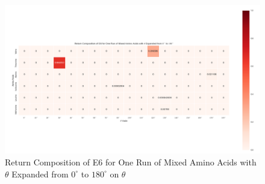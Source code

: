 \begin{figure}[!ht] \label{fig:5.6}
\centering
\includegraphics[scale=0.4]{Figures/mixture_return_composition_of_E6_for_one_run_theta_0_180.png}
\caption{Return Composition of E6 for One Run of Mixed Amino Acids with $\theta$ Expanded from $0^{\circ}$ to $180^{\circ}$ on $\theta$} 
\end{figure}


